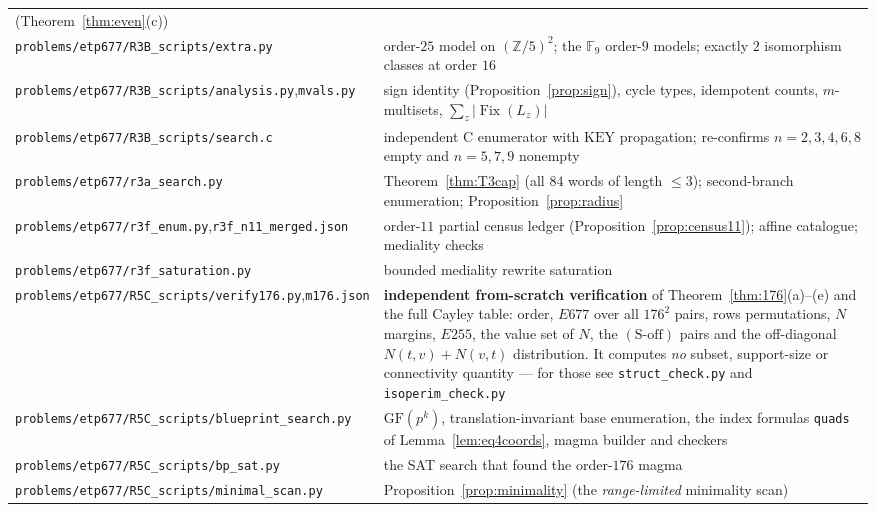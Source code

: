 \documentclass[11pt]{article}
\theoremstyle{plain}
\theoremstyle{definition}
\theoremstyle{remark}
\numberwithin{equation}{section}
\newcommand{\Z}{\mathbb{Z}}
\newcommand{\F}{\mathbb{F}}
\newcommand{\Fix}{\operatorname{Fix}}
\begin{document}
\begin{longtable}{p{}p{}}
(Theorem~\ref{thm:even}(c))\\
\texttt{problems\slash etp677\slash R3B\_scripts\slash extra.py} & order-$25$ model on $(\Z/5)^2$; the $\F_9$
order-$9$ models; exactly $2$ isomorphism classes at order $16$\\
\texttt{problems\slash etp677\slash R3B\_scripts\slash analysis.py},\newline\texttt{mvals.py} & sign identity
(Proposition~\ref{prop:sign}), cycle types, idempotent counts, $m$-multisets,
$\sum_z|\Fix(L_z)|$\\
\texttt{problems\slash etp677\slash R3B\_scripts\slash search.c} & independent C enumerator with
$\mathrm{KEY}$ propagation; re-confirms $n=2,3,4,6,8$ empty and $n=5,7,9$ nonempty\\
\texttt{problems\slash etp677\slash r3a\_search.py} & Theorem~\ref{thm:T3cap} (all $84$ words of length
$\le3$); second-branch enumeration; Proposition~\ref{prop:radius}\\
\texttt{problems\slash etp677\slash r3f\_enum.py},\newline\texttt{r3f\_n11\_merged.json} &
order-$11$ partial census ledger (Proposition~\ref{prop:census11}); affine catalogue;
mediality checks\\
\texttt{problems\slash etp677\slash r3f\_saturation.py} & bounded mediality rewrite saturation\\
\texttt{problems\slash etp677\slash R5C\_scripts\slash verify176.py},\newline\texttt{m176.json} &
\textbf{independent from-scratch verification} of Theorem~\ref{thm:176}(a)--(e) and the full
Cayley table: order, $E677$ over all $176^2$ pairs, rows permutations, $N$ margins, $E255$,
the value set of $N$, the $(\mathrm{S\text{-}off})$ pairs and the off-diagonal
$N(t,v)+N(v,t)$ distribution. It computes \emph{no} subset, support-size or connectivity
quantity --- for those see \texttt{struct\_check.py} and \texttt{isoperim\_check.py}\\
\texttt{problems\slash etp677\slash R5C\_scripts\slash blueprint\_search.py} & $\mathrm{GF}(p^k)$,
translation-invariant base enumeration, the index formulas \texttt{quads} of
Lemma~\ref{lem:eq4coords}, magma builder and checkers\\
\texttt{problems\slash etp677\slash R5C\_scripts\slash bp\_sat.py} & the SAT search that found the order-$176$
magma\\
\texttt{problems\slash etp677\slash R5C\_scripts\slash minimal\_scan.py} & Proposition~\ref{prop:minimality}
(the \emph{range-limited} minimality scan)\\

\end{longtable}
\end{document}
